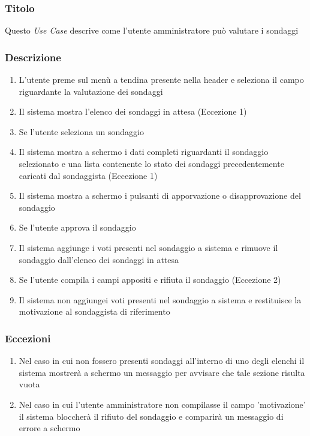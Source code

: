         \subsubsection{Titolo}
            Questo \textit{Use Case} descrive come l'utente amministratore può valutare i sondaggi 
        \subsubsection{Descrizione}
            \begin{enumerate}
                \item L'utente preme sul menù a tendina presente nella header e seleziona il campo riguardante la valutazione dei sondaggi
                \item Il sistema mostra l'elenco dei sondaggi in attesa (Eccezione 1)
                \item Se l'utente seleziona un sondaggio
                \item Il sistema mostra a schermo i dati completi riguardanti il sondaggio selezionato e una lista contenente lo stato dei sondaggi precedentemente caricati dal sondaggista (Eccezione 1)
                \item Il sistema mostra a schermo i pulsanti di apporvazione o disapprovazione del sondaggio
                \item Se l'utente approva il sondaggio
                \item Il sistema aggiunge i voti presenti nel sondaggio a sistema e rimuove il sondaggio dall'elenco dei sondaggi in attesa
                \item Se l'utente compila i campi appositi e rifiuta il sondaggio (Eccezione 2)
                \item Il sistema non aggiungei voti presenti nel sondaggio a sistema e restituisce la motivazione al sondaggista di riferimento
            \end{enumerate}
        \subsubsection{Eccezioni}
            \begin{enumerate}
                \item Nel caso in cui non fossero presenti sondaggi all'interno di uno degli elenchi il sistema mostrerà a schermo un messaggio per avvisare che tale sezione risulta vuota
                \item Nel caso in cui l'utente amministratore non compilasse il campo 'motivazione' il sistema bloccherà il rifiuto del sondaggio e comparirà un messaggio di errore a schermo
            \end{enumerate}

